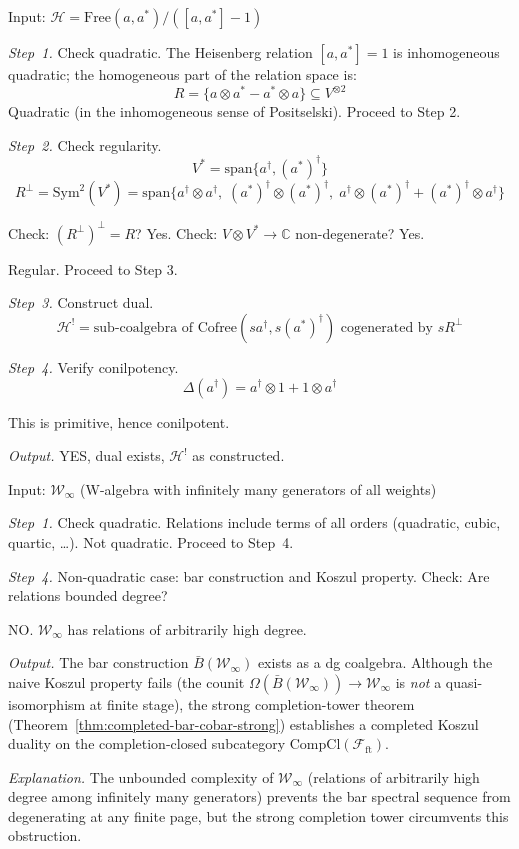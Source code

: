 \begin{example}\label{ex:algorithm-heisenberg}
Input: $\mathcal{H} = \text{Free}(a, a^*) / ([a, a^*] - 1)$

\emph{Step~1.} Check quadratic. The Heisenberg relation $[a, a^*] = 1$ is inhomogeneous quadratic; the homogeneous part of the relation space is:
\[R = \{a \otimes a^* - a^* \otimes a\} \subseteq V^{\otimes 2}\]
Quadratic (in the inhomogeneous sense of Positselski). Proceed to Step 2.

\emph{Step~2.} Check regularity.
\[V^* = \text{span}\{a^{\dagger}, (a^*)^{\dagger}\}\]
\[R^\perp = \mathrm{Sym}^2(V^*) = \text{span}\{a^{\dagger} \otimes a^{\dagger},\; (a^*)^{\dagger} \otimes (a^*)^{\dagger},\; a^{\dagger} \otimes (a^*)^{\dagger} + (a^*)^{\dagger} \otimes a^{\dagger}\}\]

Check: $(R^\perp)^\perp = R$? Yes.
Check: $V \otimes V^* \to \mathbb{C}$ non-degenerate? Yes.

Regular. Proceed to Step 3.

\emph{Step~3.} Construct dual.
\[\mathcal{H}^! = \text{sub-coalgebra of } \text{Cofree}(sa^{\dagger}, s(a^*)^{\dagger}) \text{ cogenerated by } sR^\perp\]

\emph{Step~4.} Verify conilpotency.
\[\Delta(a^{\dagger}) = a^{\dagger} \otimes 1 + 1 \otimes a^{\dagger}\]

This is primitive, hence conilpotent.

\emph{Output.} YES, dual exists, $\mathcal{H}^!$ as constructed.
\end{example}

\begin{example}\label{ex:algorithm-w-infinity}
Input: $\mathcal{W}_\infty$ (W-algebra with infinitely many generators of all weights)

\emph{Step~1.} Check quadratic.
Relations include terms of all orders (quadratic, cubic, quartic, \ldots).
Not quadratic. Proceed to Step~4.

\emph{Step~4.} Non-quadratic case: bar construction and Koszul property.
Check: Are relations bounded degree? 

NO. $\mathcal{W}_\infty$ has relations of arbitrarily high degree.

\emph{Output.} The bar construction $\bar{B}(\mathcal{W}_\infty)$ exists as a dg coalgebra.  Although the naive Koszul property fails (the counit $\Omega(\bar{B}(\mathcal{W}_\infty)) \to \mathcal{W}_\infty$ is \emph{not} a quasi-isomorphism at finite stage), the strong completion-tower theorem (Theorem~\ref{thm:completed-bar-cobar-strong}) establishes a completed Koszul duality on the completion-closed subcategory $\mathrm{CompCl}(\mathcal{F}_{\mathrm{ft}})$.

\emph{Explanation.} The unbounded complexity of $\mathcal{W}_\infty$ (relations of arbitrarily high degree among infinitely many generators) prevents the bar spectral sequence from degenerating at any finite page, but the strong completion tower circumvents this obstruction.
\end{example}

